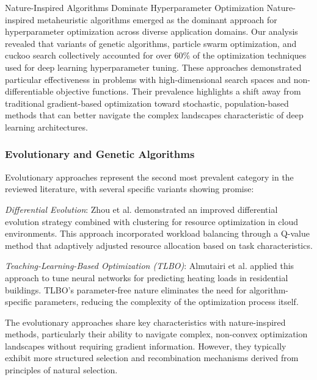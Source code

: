 \begin{themebox}{Nature-Inspired Algorithms Dominate Hyperparameter Optimization}
Nature-inspired metaheuristic algorithms emerged as the dominant approach for hyperparameter optimization across diverse application domains. Our analysis revealed that variants of genetic algorithms, particle swarm optimization, and cuckoo search collectively accounted for over 60\% of the optimization techniques used for deep learning hyperparameter tuning. These approaches demonstrated particular effectiveness in problems with high-dimensional search spaces and non-differentiable objective functions. Their prevalence highlights a shift away from traditional gradient-based optimization toward stochastic, population-based methods that can better navigate the complex landscapes characteristic of deep learning architectures.
\end{themebox}

\subsubsection{Evolutionary and Genetic Algorithms}
Evolutionary approaches represent the second most prevalent category in the reviewed literature, with several specific variants showing promise:

\textit{Differential Evolution}: Zhou et al. \citep{Zhou20211} demonstrated an improved differential evolution strategy combined with clustering for resource optimization in cloud environments. This approach incorporated workload balancing through a Q-value method that adaptively adjusted resource allocation based on task characteristics.

\textit{Teaching-Learning-Based Optimization (TLBO)}: Almutairi et al. \citep{Almutairi20225924} applied this approach to tune neural networks for predicting heating loads in residential buildings. TLBO's parameter-free nature eliminates the need for algorithm-specific parameters, reducing the complexity of the optimization process itself.

The evolutionary approaches share key characteristics with nature-inspired methods, particularly their ability to navigate complex, non-convex optimization landscapes without requiring gradient information. However, they typically exhibit more structured selection and recombination mechanisms derived from principles of natural selection.

